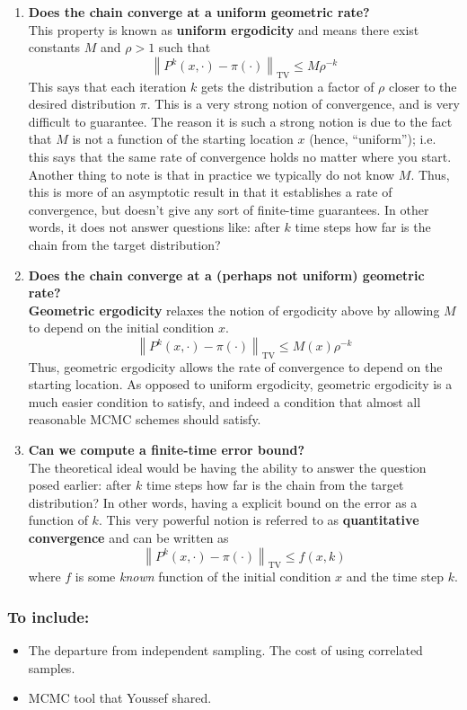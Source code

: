 \documentclass[12pt]{article}
\newcommand*{\norm}[1]{\left\lVert#1\right\rVert}
\begin{document}
\begin{enumerate}
\item \textbf{Does the chain converge at a uniform geometric rate?} \\
This property is known as \textbf{uniform ergodicity} and means there exist constants $M$ and $\rho > 1$ such that 
\[\norm{P^k(x, \cdot) - \pi(\cdot)}_{\text{TV}} \leq M\rho^{-k}\]
This says that each iteration $k$ gets the distribution a factor of $\rho$ closer to the desired distribution $\pi$. This is a very strong notion of convergence, and is very difficult to guarantee. The reason it 
is such a strong notion is due to the fact that $M$ is not a function of the starting location $x$ (hence, ``uniform''); i.e. this says that the same rate of convergence holds no matter where you start. Another thing to note is that 
in practice we typically do not know $M$. Thus, this is more of an asymptotic result in that it establishes a rate of convergence, but doesn't give any sort of finite-time guarantees. In other words, it does 
not answer questions like: after $k$ time steps how far is the chain from the target distribution? 

\item \textbf{Does the chain converge at a (perhaps not uniform) geometric rate?} \\
\textbf{Geometric ergodicity} relaxes the notion of ergodicity above by allowing $M$ to depend on the initial condition $x$. 
\[\norm{P^k(x, \cdot) - \pi(\cdot)}_{\text{TV}} \leq M(x)\rho^{-k}\]
Thus, geometric ergodicity allows the rate of convergence to depend on the starting location. As opposed to uniform ergodicity, geometric ergodicity is a much easier condition to satisfy, and indeed 
a condition that almost all reasonable MCMC schemes should satisfy. 

\item \textbf{Can we compute a finite-time error bound?} \\
The theoretical ideal would be having the ability to answer the question posed earlier: after $k$ time steps how far is the chain from the target distribution? In other words, having a explicit bound on the error 
as a function of $k$. This very powerful notion is referred to as \textbf{quantitative convergence} and can be written as 
\[\norm{P^k(x, \cdot) - \pi(\cdot)}_{\text{TV}} \leq f(x, k)\]
where $f$ is some \textit{known} function of the initial condition $x$ and the time step $k$. 


\end{enumerate}


\subsubsection{To include:}
\begin{itemize}
\item The departure from independent sampling. The cost of using correlated samples. 
\item MCMC tool that Youssef shared. 
\end{itemize}
\end{document}
